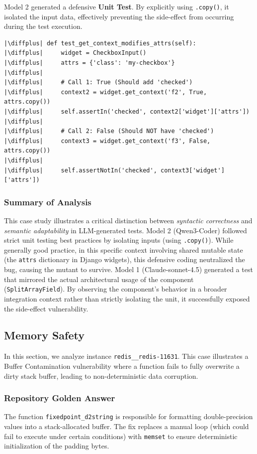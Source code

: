 \documentclass[11pt]{article}
\newcommand{\diffplus}{\textcolor{green!70!black}{+}} %
\begin{document}
Model 2 generated a defensive \textbf{Unit Test}. By explicitly using \texttt{.copy()}, it isolated the input data, effectively preventing the side-effect from occurring during the test execution.

\begin{verbatim}
|\diffplus| def test_get_context_modifies_attrs(self):
|\diffplus|     widget = CheckboxInput()
|\diffplus|     attrs = {'class': 'my-checkbox'}
|\diffplus|     
|\diffplus|     # Call 1: True (Should add 'checked')
|\diffplus|     context2 = widget.get_context('f2', True, attrs.copy())
|\diffplus|     self.assertIn('checked', context2['widget']['attrs'])
|\diffplus|     
|\diffplus|     # Call 2: False (Should NOT have 'checked')
|\diffplus|     context3 = widget.get_context('f3', False, attrs.copy())
|\diffplus|     
|\diffplus|     self.assertNotIn('checked', context3['widget']['attrs'])
\end{verbatim}
\subsubsection{Summary of Analysis}

This case study illustrates a critical distinction between \textit{syntactic correctness} and \textit{semantic adaptability} in LLM-generated tests. 
Model 2 (Qwen3-Coder) followed strict unit testing best practices by isolating inputs (using \texttt{.copy()}). While generally good practice, in this specific context involving shared mutable state (the \texttt{attrs} dictionary in Django widgets), this defensive coding neutralized the bug, causing the mutant to survive. Model 1 (Claude-sonnet-4.5) generated a test that mirrored the actual architectural usage of the component (\texttt{SplitArrayField}). By observing the component's behavior in a broader integration context rather than strictly isolating the unit, it successfully exposed the side-effect vulnerability.
\subsection{Memory Safety}

In this section, we analyze instance \texttt{redis\_\_redis-11631}. This case illustrates a Buffer Contamination vulnerability where a function fails to fully overwrite a dirty stack buffer, leading to non-deterministic data corruption.

\subsubsection{Repository Golden Answer}
The function \texttt{fixedpoint\_d2string} is responsible for formatting double-precision values into a stack-allocated buffer. The fix replaces a manual loop (which could fail to execute under certain conditions) with \texttt{memset} to ensure deterministic initialization of the padding bytes.
\end{document}
